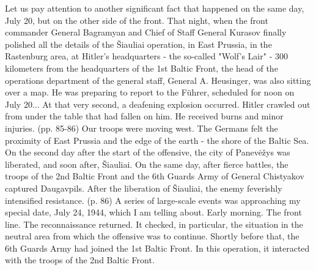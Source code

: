 {
Let us pay attention to another significant fact that happened on the same day, July 20, but on the other side of the front. That night, when the front commander General Bagramyan and Chief of Staff General Kurasov finally polished all the details of the Šiauliai operation, in East Prussia, in the Rastenburg area, at Hitler's headquarters - the so-called "Wolf's Lair" - 300 kilometers from the headquarters of the 1st Baltic Front, the head of the operations department of the general staff, General A. Heusinger, was also sitting over a map. He was preparing to report to the Führer, scheduled for noon on July 20... At that very second, a deafening explosion occurred. Hitler crawled out from under the table that had fallen on him. He received burns and minor injuries. (pp. 85-86) Our troops were moving west. The Germans felt the proximity of East Prussia and the edge of the earth - the shore of the Baltic Sea. On the second day after the start of the offensive, the city of Panevėžys was liberated, and soon after, Šiauliai. On the same day, after fierce battles, the troops of the 2nd Baltic Front and the 6th Guards Army of General Chistyakov captured Daugavpils. After the liberation of Šiauliai, the enemy feverishly intensified resistance. (p. 86) A series of large-scale events was approaching my special date, July 24, 1944, which I am telling about. Early morning. The front line. The reconnaissance returned. It checked, in particular, the situation in the neutral area from which the offensive was to continue. Shortly before that, the 6th Guards Army had joined the 1st Baltic Front. In this operation, it interacted with the troops of the 2nd Baltic Front.}

